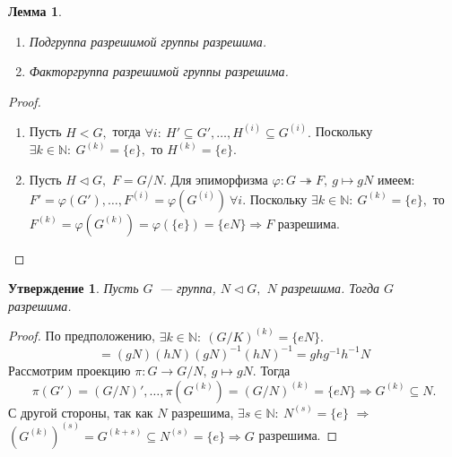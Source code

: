 \documentclass[a4paper, 14pt]{extarticle}
\newcommand{\naturals}{\mathbb{N}}
\newcommand{\suchthat}{{:}{ } \ }
\renewcommand{\phi}{\varphi}
\theoremstyle{definition}
\theoremstyle{plain}
\numberwithin{theorem}{section}
\numberwithin{definition}{section}
\newtheorem{statement}{Утверждение}
\numberwithin{statement}{section}
\newtheorem{lemma}{Лемма}
\numberwithin{lemma}{section}
\numberwithin{consequence}{section}
\begin{document}
        \begin{lemma}
        \
            \begin{enumerate}
            \setlength\itemsep{0.1em}
                \item Подгруппа разрешимой группы разрешима. 
                \item Факторгруппа разрешимой группы разрешима. 
            \end{enumerate}
        \end{lemma}
        \begin{proof}
        \
            \begin{enumerate}
            \setlength\itemsep{0.1em}
                \item Пусть ${H<G,}$ тогда ${\forall i\suchthat H' \subseteq G', \ldots, H^{(i)} \subseteq G^{(i)}.}$ Поскольку ${\exists k \in \naturals \suchthat G^{(k)} = \{e\},}$ то ${H^{(k)} = \{e\}.}$
                \item Пусть ${H \lhd G,}$ ${F = G/N.}$ Для эпиморфизма ${\phi : G \twoheadrightarrow F, \ g \mapsto gN}$ имеем: ${F' = \phi(G'), \ldots, F^{(i)} = \phi(G^{(i)}) \ \forall i.}$ Поскольку ${\exists k \in \naturals \suchthat G^{(k)} = \{e\},}$ то ${F^{(k)} = \phi(G^{(k)}) = \phi(\{e\}) = \{eN\} \Rightarrow F}$ разрешима.
            \end{enumerate}
        \end{proof}
        \begin{statement}
            Пусть $G$~--- группа, ${N \lhd G,}$ $N$ разрешима. Тогда $G$ разрешима.
        \end{statement}
        \begin{proof}
            По предположению, ${\exists k \in \naturals{:} \ (G/K)^{(k)} = \{eN\}.}$
            \begin{equation*}
                [gN, hN] = (gN)(hN)(gN)^{-1}(hN)^{-1} = ghg^{-1}h^{-1}N
            \end{equation*}
            Рассмотрим проекцию ${\pi : G \rightarrow G/N, \ g \mapsto gN.}$ Тогда
            \begin{equation*}
                \pi(G') = (G/N)', \ldots, \pi(G^{(k)}) = (G/N)^{(k)} = \{eN\} \Rightarrow G^{(k)} \subseteq N.
            \end{equation*}
            С другой стороны, так как $N$ разрешима, ${\exists s \in \naturals{:} \ N^{(s)} = \{e\}}$ $\Rightarrow$ ${{(G^{(k)})}^{(s)} = G^{(k+s)} \subseteq N^{(s)} = \{e\}} \Rightarrow G$ разрешима. \qedhere
        \end{proof}
        \newpage
\end{document}
